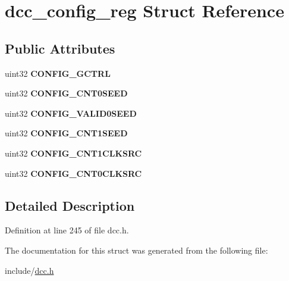 \hypertarget{structdcc__config__reg}{}\section{dcc\+\_\+config\+\_\+reg Struct Reference}
\label{structdcc__config__reg}
\subsection*{Public Attributes}
\begin{DoxyCompactItemize}
\item 
\mbox{\label{structdcc__config__reg_a8f7e1439184c35b567b12efd426e41fb}} 
uint32 {\bfseries C\+O\+N\+F\+I\+G\+\_\+\+G\+C\+T\+RL}
\item 
\mbox{\label{structdcc__config__reg_acd374e538423583537034cb9b4633c55}} 
uint32 {\bfseries C\+O\+N\+F\+I\+G\+\_\+\+C\+N\+T0\+S\+E\+ED}
\item 
\mbox{\label{structdcc__config__reg_afdf5149c435370be1d52d63de100e86e}} 
uint32 {\bfseries C\+O\+N\+F\+I\+G\+\_\+\+V\+A\+L\+I\+D0\+S\+E\+ED}
\item 
\mbox{\label{structdcc__config__reg_a1601f015af2f53987759b7eca1f4b579}} 
uint32 {\bfseries C\+O\+N\+F\+I\+G\+\_\+\+C\+N\+T1\+S\+E\+ED}
\item 
\mbox{\label{structdcc__config__reg_a5d3efe4834e7c7984bea2eeaf8605243}} 
uint32 {\bfseries C\+O\+N\+F\+I\+G\+\_\+\+C\+N\+T1\+C\+L\+K\+S\+RC}
\item 
\mbox{\label{structdcc__config__reg_abf38b42add13707abd174dd9d443b989}} 
uint32 {\bfseries C\+O\+N\+F\+I\+G\+\_\+\+C\+N\+T0\+C\+L\+K\+S\+RC}
\end{DoxyCompactItemize}


\subsection{Detailed Description}


Definition at line 245 of file dcc.\+h.



The documentation for this struct was generated from the following file\+:\begin{DoxyCompactItemize}
\item 
include/\mbox{\hyperlink{dcc_8h}{dcc.\+h}}\end{DoxyCompactItemize}
